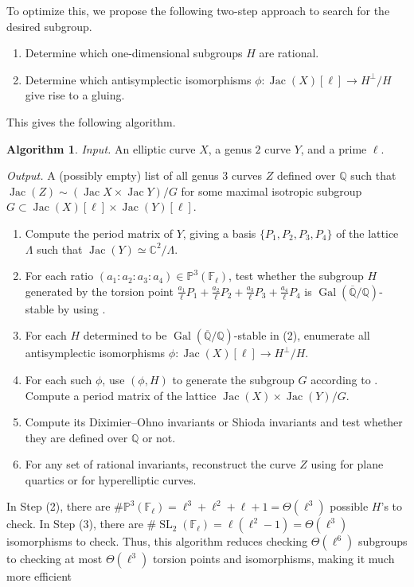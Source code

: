 \documentclass{amsproc}
\numberwithin{equation}{section}
\theoremstyle{definition}
\newtheorem{algorithm}[equation]{Algorithm}
\theoremstyle{remark}
\DeclareMathOperator{\Jac}{Jac}
\DeclareMathOperator{\SL}{SL}
\DeclareMathOperator{\Gal}{Gal}
\newcommand{\QQ}{\mathbb Q}
\newcommand{\CC}{\mathbb C}
\newcommand{\FF}{\mathbb F}
\newcommand{\Qbar}{\overline{\QQ}}
\newcommand{\GalQ}{\Gal(\Qbar/\QQ)}
\begin{document}
To optimize this, we propose the following two-step approach to search for the desired subgroup.
\begin{enumerate}
    \item Determine which one-dimensional subgroups $H$ are rational.
    \item Determine which antisymplectic isomorphisms $\phi : \Jac(X)[\ell]\to H^\perp/H$ give rise to a gluing.
\end{enumerate}
This gives the following algorithm.
\begin{algorithm}
\label{alg:fast_gluing}
\emph{Input.} An elliptic curve $X$, a genus $2$ curve $Y$, and a prime $\ell$.

\emph{Output.} A (possibly empty) list of all genus $3$ curves $Z$ defined over $\QQ$ such that $\Jac(Z) \sim (\Jac X\times\Jac Y)/G$ for some maximal isotropic subgroup $G\subset \Jac(X)[\ell]\times\Jac(Y)[\ell]$.

\begin{enumerate}
    \item Compute the period matrix of $Y$, giving a basis $\{P_1,P_2,P_3,P_4\}$ of the lattice $\Lambda$ such that $\Jac(Y)\simeq \CC^2/\Lambda$. 
    \item For each ratio $(a_1:a_2:a_3:a_4)\in\mathbb P^3(\FF_\ell)$, test whether the subgroup $H$ generated by the torsion point $\tfrac{a_1}\ell P_1 + \tfrac{a_2}\ell P_2 + \tfrac{a_3}\ell P_3 + \tfrac{a_4}\ell P_4$ is $\GalQ$-stable by using .
    
    \item 
    For each $H$ determined to be $\GalQ$-stable in (2), enumerate all antisymplectic isomorphisms $\phi : \Jac(X)[\ell]\to H^\perp/H$.
    
    \item For each such $\phi$, use $(\phi, H)$ to generate the subgroup $G$ according to \cite[Prop.~1.18]{1_plus_2_2_torsion_gluing}.
    Compute a period matrix of the lattice $\Jac(X)\times\Jac(Y)/G$.
    \item Compute its Diximier--Ohno invariants \cite{quartic_reconstruction} or Shioda invariants \cite{hyperelliptic_reconstruction} and test whether they are defined over $\QQ$ or not.
    \item For any set of rational invariants, reconstruct the curve $Z$ using \cite[Alg.~2.21]{1_plus_2_2_torsion_gluing} for plane quartics or \cite{hyperelliptic_reconstruction} for hyperelliptic curves.
\end{enumerate}
\end{algorithm}
In Step (2), there are $\#\mathbb P^3(\FF_\ell) = \ell^3 + \ell^2 + \ell + 1 = \Theta(\ell^3)$ possible $H$'s to check. In Step (3), there are $\#\SL_2(\FF_\ell) = \ell(\ell^2-1) = \Theta(\ell^3)$ isomorphisms to check.
Thus, this algorithm reduces checking $\Theta(\ell^6)$ subgroups to checking at most $\Theta(\ell^3)$ torsion points and isomorphisms, making it much more efficient
\end{document}
